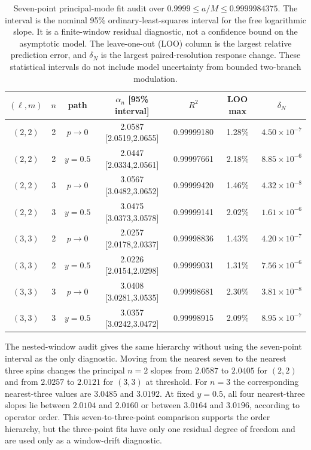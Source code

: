 \documentclass[aps,prd,twocolumn,10pt,nofootinbib,superscriptaddress,floatfix]{revtex4-2}
\begin{document}
\begin{table}[t]
\caption{Seven-point principal-mode fit audit over
$0.9999\leq a/M\leq0.9999984375$.  The interval is the nominal 95\%
ordinary-least-squares interval for the free logarithmic slope.  It is a
finite-window residual diagnostic, not a confidence bound on the asymptotic
model.  The leave-one-out (LOO)
column is the largest relative prediction error, and $\delta_N$ is the largest
paired-resolution response change.  These statistical intervals do not
include model uncertainty from bounded two-branch modulation.}
\label{tab:power-fit-quality}
\begin{ruledtabular}
\begin{tabular}{c c c c c c c}
$(\ell,m)$ & $n$ & path & $\alpha_n$ [95\% interval] & $R^2$
& LOO max & $\delta_N$\\
\hline
$(2,2)$ & 2 & $p\to0$ & 2.0587 [2.0519,2.0655] & 0.99999180 & 1.28\% & $4.50\times10^{-7}$\\
$(2,2)$ & 2 & $y=0.5$ & 2.0447 [2.0334,2.0561] & 0.99997661 & 2.18\% & $8.85\times10^{-6}$\\
$(2,2)$ & 3 & $p\to0$ & 3.0567 [3.0482,3.0652] & 0.99999420 & 1.46\% & $4.32\times10^{-8}$\\
$(2,2)$ & 3 & $y=0.5$ & 3.0475 [3.0373,3.0578] & 0.99999141 & 2.02\% & $1.61\times10^{-6}$\\
$(3,3)$ & 2 & $p\to0$ & 2.0257 [2.0178,2.0337] & 0.99998836 & 1.43\% & $4.20\times10^{-7}$\\
$(3,3)$ & 2 & $y=0.5$ & 2.0226 [2.0154,2.0298] & 0.99999031 & 1.31\% & $7.56\times10^{-6}$\\
$(3,3)$ & 3 & $p\to0$ & 3.0408 [3.0281,3.0535] & 0.99998681 & 2.30\% & $3.81\times10^{-8}$\\
$(3,3)$ & 3 & $y=0.5$ & 3.0357 [3.0242,3.0472] & 0.99998915 & 2.09\% & $8.95\times10^{-7}$\\
\end{tabular}
\end{ruledtabular}
\end{table}

The nested-window audit gives the same hierarchy without using the
seven-point interval as the only diagnostic.  Moving from the nearest seven to
the nearest three spins changes the principal $n=2$ slopes from
$2.0587$ to $2.0405$ for $(2,2)$ and from $2.0257$ to $2.0121$ for $(3,3)$ at
threshold.  For $n=3$ the corresponding nearest-three values are $3.0485$ and
$3.0192$.  At fixed $y=0.5$, all four nearest-three slopes lie between
$2.0104$ and $2.0160$ or between $3.0164$ and $3.0196$, according to operator
order.  This seven-to-three-point comparison supports the order hierarchy, but the
three-point fits have only one residual degree of freedom and are used only as
a window-drift diagnostic.
\end{document}
